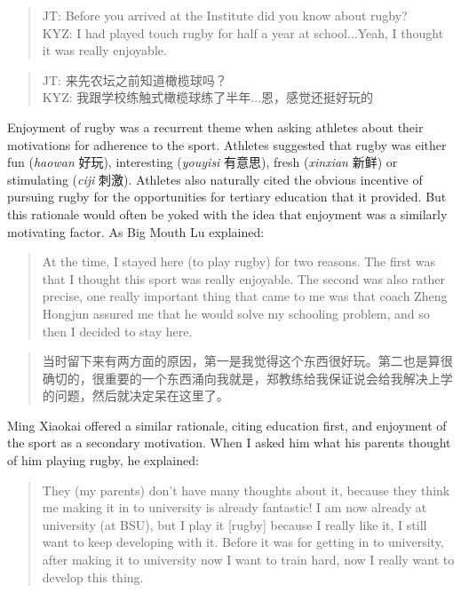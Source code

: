 \begin{CJK}{UTF8}{gbsn}
      \begin{quote}
        JT: Before you arrived at the Institute did you know about rugby?\\
        KYZ: I had played touch rugby for half a year at school...Yeah, I thought it was really enjoyable.
      \end{quote}

      \begin{quote}
        JT: 来先农坛之前知道橄榄球吗？\\
        KYZ: 我跟学校练触式橄榄球练了半年...恩，感觉还挺好玩的
      \end{quote}

Enjoyment of rugby was a recurrent theme when asking athletes about their motivations for adherence to the sport.  Athletes suggested that rugby was either fun (\textit{haowan} 好玩), interesting (\textit{youyisi} 有意思), fresh (\textit{xinxian} 新鲜) or stimulating (\textit{ciji} 刺激).  Athletes also naturally cited the obvious incentive of pursuing rugby for the opportunities for tertiary education that it provided.  But this rationale would often be yoked with the idea that enjoyment was a similarly motivating factor.  As Big Mouth Lu explained:

    \begin{quote}
      At the time, I stayed here (to play rugby) for two reasons.  The first was that I thought this sport was really enjoyable. The second was also rather precise, one really important thing that came to me was that coach Zheng Hongjun assured me that he would solve my schooling problem, and so then I decided to stay here.
    \end{quote}

    \begin{quote}
      当时留下来有两方面的原因，第一是我觉得这个东西很好玩。第二也是算很确切的，很重要的一个东西涌向我就是，郑教练给我保证说会给我解决上学的问题，然后就决定呆在这里了。 
    \end{quote}

Ming Xiaokai offered a similar rationale, citing education first, and enjoyment of the sport as a secondary motivation.  When I asked him what his parents thought of him playing rugby, he explained:

    \begin{quote}
      They (my parents) don't have many thoughts about it, because they think me making it in to university is already fantastic! I am now already at university (at BSU), but I play it [rugby] because I really like it, I still want to keep developing with it. Before it was for getting in to university, after making it to university now I want to train hard, now I really want to develop this thing.
    \end{quote}


\end{CJK}
